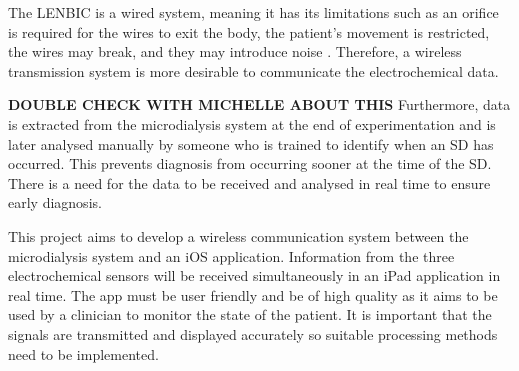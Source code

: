 The LENBIC is a wired system, meaning it has its limitations such as an orifice is required for the wires to exit the body, the patient's movement is restricted, the wires may break, and they may introduce noise \cite{Ferguson2011}. Therefore, a wireless transmission system is more desirable to communicate the electrochemical data. 

\textbf{DOUBLE CHECK WITH MICHELLE ABOUT THIS}
Furthermore, data is extracted from the microdialysis system at the end of experimentation and is later analysed manually by someone who is trained to identify when an SD has occurred. This prevents diagnosis from occurring sooner at the time of the SD. There is a need for the data to be received and analysed in real time to ensure early diagnosis. 

This project aims to develop a wireless communication system between the microdialysis system and an iOS application. Information from the three electrochemical sensors will be received simultaneously in an iPad application in real time. The app must be user friendly and be of high quality as it aims to be used by a clinician to monitor the state of the patient. It is important that the signals are transmitted and displayed accurately so suitable processing methods need to be implemented. 

